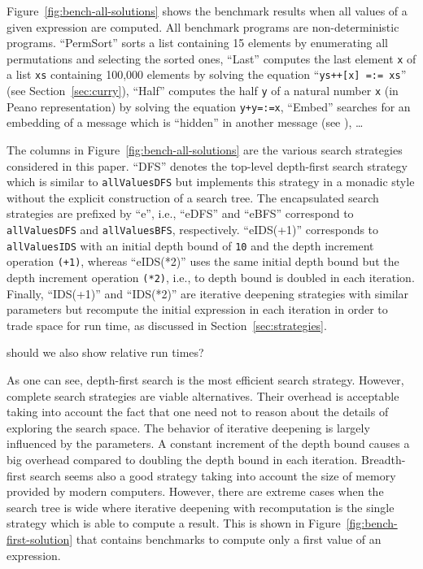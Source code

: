 \documentclass[english]{lni}
\newcommand{\code}[1]{\texttt{\small{}#1}}
\newcommand{\ccode}[1]{``\code{#1}''}
\begin{document}
Figure~\ref{fig:bench-all-solutions} shows the benchmark results
when all values of a given expression are computed.
All benchmark programs are non-deterministic programs.
``PermSort'' sorts a list containing 15 elements by enumerating
all permutations and selecting the sorted ones,
``Last'' computes the last element \code{x}
of a list \code{xs} containing 100,000 elements
by solving the equation \ccode{ys++[x] =:= xs}
(see Section~\ref{sec:curry}),
``Half'' computes the half \code{y} of a natural number \code{x}
(in Peano representation) by solving the equation \code{y+y=:=x},
``Embed'' searches for an embedding of a message
which is ``hidden'' in another message
(see \cite[Sect.~4.1]{Antoy10JSC}),
\ldots

The columns in Figure~\ref{fig:bench-all-solutions}
are the various search strategies considered in this paper.
``DFS'' denotes the top-level depth-first search strategy
which is similar to \code{allValuesDFS} but implements
this strategy in a monadic style without the explicit
construction of a search tree.
The encapsulated search strategies are prefixed by ``e'',
i.e., ``eDFS'' and ``eBFS'' correspond to \code{allValuesDFS}
and \code{allValuesBFS}, respectively.
``eIDS(+1)'' corresponds to \code{allValuesIDS}
with an initial depth bound of \code{10} and the depth increment
operation \code{(+1)}, whereas ``eIDS(*2)'' uses the same initial depth bound
but the depth increment operation \code{(*2)}, i.e., to depth bound
is doubled in each iteration.
Finally, ``IDS(+1)'' and ``IDS(*2)'' are iterative deepening
strategies with similar parameters but recompute the initial
expression in each iteration in order to trade space for run time,
as discussed in Section~\ref{sec:strategies}.

{\sc should we also show relative run times?}

As one can see, depth-first search is the most efficient
search strategy.
However, complete search strategies are viable alternatives.
Their overhead is acceptable taking into account the fact
that one need not to reason about the details of exploring the
search space. The behavior of iterative deepening is largely
influenced by the parameters.
A constant increment of the depth bound causes a big overhead
compared to doubling the depth bound in each iteration.
Breadth-first search seems also a good strategy
taking into account the size of memory provided by modern computers.
However, there are extreme cases when the search tree is wide
where iterative deepening with recomputation is the single
strategy which is able to compute a result.
This is shown in Figure~\ref{fig:bench-first-solution}
that contains benchmarks to compute only a first value
of an expression.
\end{document}
